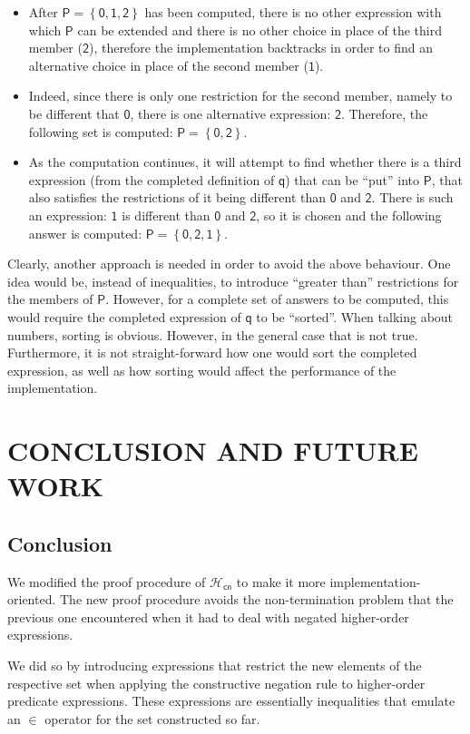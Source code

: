 \documentclass[inscr,ack,preface]{dithesis}
\theoremstyle{definition}
\newcommand{\hcn}{$\mathcal{H}_\mathsf{cn}$}
\newcommand{\msf}[1]{$\mathsf{#1}$}
\begin{document}
\begin{itemize}
\item After \msf{P = \left\{ 0, 1, 2 \right\}} has been computed, there is no other expression with which \msf{P} can be extended and there is no other choice in place of the third member (\msf{2}), therefore the implementation backtracks in order to find an alternative choice in place of the second member (\msf{1}).
\item Indeed, since there is only one restriction for the second member, namely to be different that \msf{0}, there is one alternative expression: \msf{2}. Therefore, the following set is computed: \msf{P = \left\{ 0, 2 \right\}}.
\item As the computation continues, it will attempt to find whether there is a third expression (from the completed definition of \msf{q}) that can be ``put'' into \msf{P}, that also satisfies the restrictions of it being different than \msf{0} and \msf{2}. There is such an expression: \msf{1} is different than \msf{0} and \msf{2}, so it is chosen and the following answer is computed: \msf{P = \left\{ 0, 2, 1 \right\}}.
\end{itemize}

Clearly, another approach is needed in order to avoid the above behaviour. One idea would be, instead of inequalities, to introduce ``greater than'' restrictions for the members of \msf{P}. However, for a complete set of answers to be computed, this would require the completed expression of \msf{q} to be ``sorted''. When talking about numbers, sorting is obvious. However, in the general case that is not true. Furthermore, it is not straight-forward how one would sort the completed expression, as well as how sorting would affect the performance of the implementation.

\chapter{CONCLUSION AND FUTURE WORK}
\label{chap:conclusion}

\section{Conclusion}
We modified the proof procedure of \hcn{} to make it more implementation-oriented. The new proof procedure avoids the non-termination problem that the previous one encountered when it had to deal with negated higher-order expressions.

We did so by introducing expressions that restrict the new elements of the respective set when applying the constructive negation rule to higher-order predicate expressions. These expressions are essentially inequalities that emulate an $\in$ operator for the set constructed so far.
\end{document}
